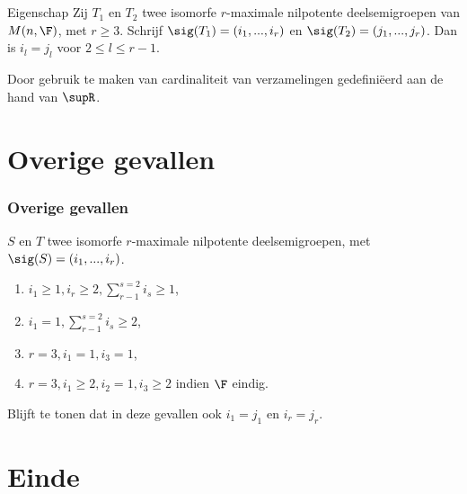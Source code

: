 \begin{frame}
\frametitle{ $ $ }

\begin{block}{Eigenschap}
Zij $T_1$ en $T_2$ twee isomorfe $r$-maximale nilpotente deelsemigroepen van $M(n,\F)$, met $r \geq 3$. Schrijf $\sig(T_1) = (i_1, ..., i_r)$ en $\sig(T_2) = (j_1, ..., j_r)$. Dan is $i_l = j_l$ voor $2 \leq l \leq r-1$.
\end{block}

\begin{block}{}
Door gebruik te maken van cardinaliteit van verzamelingen gedefini\"eerd aan de hand van $\supR$.
\end{block}

\end{frame}


\section{Overige gevallen}

\begin{frame}
\frametitle{Overige gevallen}

\begin{block}{}
$S$ en $T$ twee isomorfe $r$-maximale nilpotente deelsemigroepen, met $\sig(S) = (i_1, ...,i_r)$.

\begin{enumerate}
\item $i_1 \geq 1, i_r \geq 2, \sum_{r-1}^{s=2} i_s \geq 1 $,
\item $i_1 = 1, \sum_{r-1}^{s=2} i_s \geq 2 $,
\item $r=3, i_1 = 1, i_3 = 1 $,
\item $r=3, i_1 \geq 2, i_2 = 1, i_3 \geq 2 $ indien $\F$ eindig.
\end{enumerate}

\end{block}

\begin{block}{}
Blijft te tonen dat in deze gevallen ook $i_1 = j_1$ en $i_r = j_r$. 
\end{block}

\end{frame}


\section{Einde}

